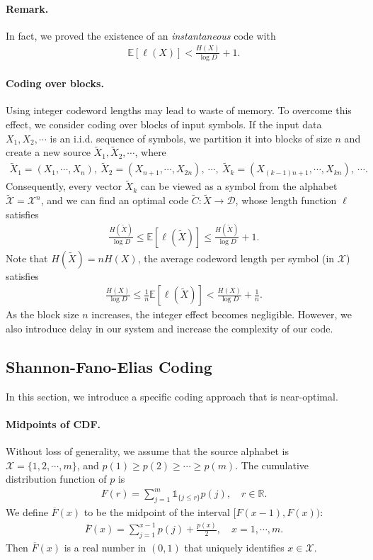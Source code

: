 \documentclass{article}
\numberwithin{equation}{section}
\newcommand{\E}{\mathbb{E}}
\newcommand{\bbR}{\mathbb{R}}
\renewcommand{\cal}{\mathcal}
\newcommand{\ol}{\overline}
\newcommand{\wt}{\widetilde}
\theoremstyle{plain}
\theoremstyle{definition}
\begin{document}
\paragraph{Remark.} In fact, we proved the existence of an \textit{instantaneous} code with
\begin{align*}
	\E\left[\ell(X)\right]<\frac{H(X)}{\log D}+1.
\end{align*}
\paragraph{Coding over blocks.} Using integer codeword lengths may lead to waste of memory. To overcome this effect, we consider coding over blocks of input symbols. If the input data $X_1,X_2,\cdots$ is an i.i.d. sequence of symbols, we partition it into blocks of size $n$ and create a new source $\wt{X}_1,\wt{X}_2,\cdots$, where
\begin{align*}
	\wt{X}_1=(X_1,\cdots,X_n),\ \wt{X}_2=(X_{n+1},\cdots,X_{2n}),\ \cdots,\ \wt{X}_k=(X_{(k-1)n+1},\cdots,X_{kn}),\ \cdots.
\end{align*}
Consequently, every vector $\wt{X}_k$ can be viewed as a symbol from the alphabet $\wt{\cal{X}}=\cal{X}^n$, and we can find an optimal code $\wt{C}:\wt{X}\to\cal{D}$, whose length function $\ell$ satisfies
\begin{align*}
	\frac{H(\wt{X})}{\log D}\leq\E\left[\ell(\wt{X})\right]\leq\frac{H(\wt{X})}{\log D}+1.
\end{align*}
Note that $H(\wt{X})=nH(X)$, the average codeword length per symbol (in $\cal{X}$) satisfies
\begin{align*}
	\frac{H(X)}{\log D}\leq\frac{1}{n}\E\left[\ell(\wt{X})\right]<\frac{H(X)}{\log D}+\frac{1}{n}.
\end{align*}
As the block size $n$ increases, the integer effect becomes negligible. However, we also introduce delay in our system and increase the complexity of our code.

\subsection{Shannon-Fano-Elias Coding}
In this section, we introduce a specific coding approach that is near-optimal.
\paragraph{Midpoints of CDF.} Without loss of generality, we assume that the source alphabet is $\cal{X}=\{1,2,\cdots,m\}$, and $p(1)\geq p(2)\geq\cdots\geq p(m)$. The cumulative distribution function of $p$ is
\begin{align*}
	F(r)=\sum_{j=1}^m \mathds{1}_{\{j\leq r\}}p(j),\quad r\in\bbR.
\end{align*}
We define $\ol{F}(x)$ to be the midpoint of the interval $[F(x-1),F(x))$:
\begin{align*}
	\ol{F}(x)=\sum_{j=1}^{x-1}p(j)+\frac{p(x)}{2},\quad x=1,\cdots,m.
\end{align*}
Then $\ol{F}(x)$ is a real number in $(0,1)$ that uniquely identifies $x\in\cal{X}$.
\end{document}
